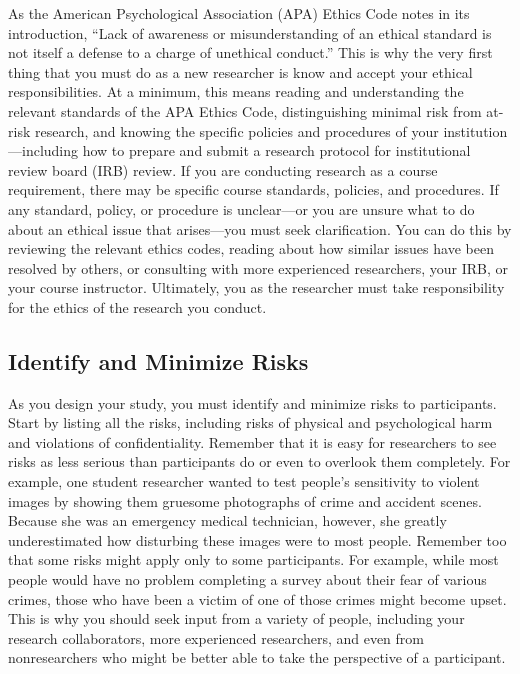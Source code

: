 \documentclass[
]{krantz}
\begin{document}
As the American Psychological Association (APA) Ethics Code notes in its introduction, ``Lack of awareness or misunderstanding of an ethical standard is not itself a defense to a charge of unethical conduct.'' This is why the very first thing that you must do as a new researcher is know and accept your ethical responsibilities. At a minimum, this means reading and understanding the relevant standards of the APA Ethics Code, distinguishing minimal risk from at-risk research, and knowing the specific policies and procedures of your institution---including how to prepare and submit a research protocol for institutional review board (IRB) review. If you are conducting research as a course requirement, there may be specific course standards, policies, and procedures. If any standard, policy, or procedure is unclear---or you are unsure what to do about an ethical issue that arises---you must seek clarification. You can do this by reviewing the relevant ethics codes, reading about how similar issues have been resolved by others, or consulting with more experienced researchers, your IRB, or your course instructor. Ultimately, you as the researcher must take responsibility for the ethics of the research you conduct.

\subsection*{Identify and Minimize Risks}\label{identify-and-minimize-risks}


As you design your study, you must identify and minimize risks to participants. Start by listing all the risks, including risks of physical and psychological harm and violations of confidentiality. Remember that it is easy for researchers to see risks as less serious than participants do or even to overlook them completely. For example, one student researcher wanted to test people's sensitivity to violent images by showing them gruesome photographs of crime and accident scenes. Because she was an emergency medical technician, however, she greatly underestimated how disturbing these images were to most people. Remember too that some risks might apply only to some participants. For example, while most people would have no problem completing a survey about their fear of various crimes, those who have been a victim of one of those crimes might become upset. This is why you should seek input from a variety of people, including your research collaborators, more experienced researchers, and even from nonresearchers who might be better able to take the perspective of a participant.
\end{document}
